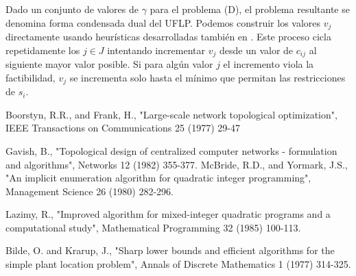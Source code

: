 \documentclass[twoside,12pt]{article}
\begin{document}
Dado un conjunto de valores de $\gamma$ para el problema (D), el problema resultante se denomina forma condensada dual del UFLP. Podemos construir los valores $v_j$ directamente usando heurísticas desarrolladas también en \cite{bilde}. Este proceso cicla repetidamente los $j\in J$ intentando incrementar $v_j$ desde un valor de $c_{ij}$ al siguiente mayor valor posible. Si para algún valor $j$ el incremento viola la factibilidad, $v_j$ se incrementa solo hasta el mínimo que permitan las restricciones de $s_i$.
\newpage
\begin{thebibliography}{9}
Boorstyn, R.R., and Frank, H., "Large-scale network
topological optimization", IEEE Transactions on Communications
25 (1977) 29-47

Gavish, B., "Topological design of centralized computer
networks - formulation and algorithms", Networks 12
(1982) 355-377. 
McBride, R.D., and Yormark, J.S., "An implicit enumeration algorithm for quadratic integer programming", Management Science 26 (1980) 282-296.

Lazimy, R., "Improved algorithm for mixed-integer quadratic programs and a computational study", Mathematical Programming 32 (1985) 100-113.

Bilde, O. and Krarup, J., "Sharp lower bounds and
efficient algorithms for the simple plant location problem",
Annals of Discrete Mathematics 1 (1977) 314-325.
\end{thebibliography} 
\end{document}
